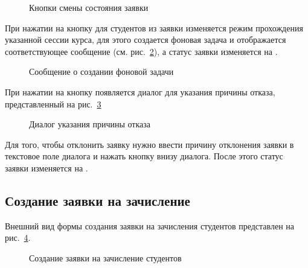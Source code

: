 \begin{figure}[H]
	\caption{Кнопки смены состояния заявки}
	\label{img:student:change_mode_req_detail_buttons}
\end{figure}

При нажатии на кнопку  для студентов из заявки изменяется режим прохождения указанной  
сессии курса, для этого создается фоновая задача и отображается соответствующее сообщение 
(см. рис.~\ref{img:student:req_change_mode_accept}), а статус заявки изменяется на .
\begin{figure}[H]
	\caption{Сообщение о создании фоновой задачи}
	\label{img:student:req_change_mode_accept}
\end{figure}

При нажатии на кнопку  появляется диалог для указания причины отказа, 
представленный на рис.~\ref{img:student:change_mode_req_detail_decline}
\begin{figure}[H]
	\caption{Диалог указания причины отказа}
	\label{img:student:change_mode_req_detail_decline}
\end{figure}
Для того, чтобы отклонить заявку нужно ввести причину отклонения заявки в текстовое поле диалога 
и нажать кнопку  внизу диалога. После этого статус заявки изменяется на .


\subsection{Создание заявки на зачисление}
Внешний вид формы создания заявки на зачисления студентов представлен на рис.~\ref{img:student:enroll_req_create}.

\begin{figure}[H]
	\caption{Создание заявки на зачисление студентов}
	\label{img:student:enroll_req_create}
\end{figure}

